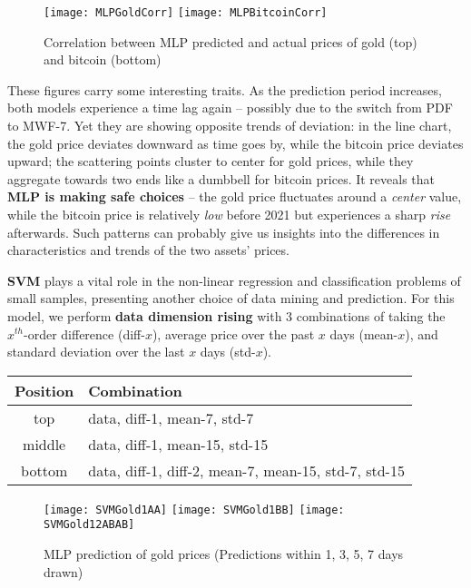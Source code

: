 \documentclass{mcmthesis}
\begin{document}
{	\begin{figure}[h]
		\centering \texttt{[image: MLPGoldCorr]}
		\centering \texttt{[image: MLPBitcoinCorr]}
		\caption{Correlation between MLP predicted and actual prices of gold (top) and bitcoin (bottom)}
	\end{figure}
	
	These figures carry some interesting traits. As the prediction period increases, both models experience a time lag again -- possibly due to the switch from PDF to MWF-7. Yet they are showing opposite trends of deviation: in the line chart, the gold price deviates downward as time goes by, while the bitcoin price deviates upward; the scattering points cluster to center for gold prices, while they aggregate towards two ends like a dumbbell for bitcoin prices. It reveals that \textbf{MLP is making safe choices} -- the gold price fluctuates around a \textit{center} value, while the bitcoin price is relatively \textit{low} before 2021 but experiences a sharp \textit{rise} afterwards. Such patterns can probably give us insights into the differences in characteristics and trends of the two assets' prices. 
	
	\textbf{SVM} plays a vital role in the non-linear regression and classification problems of small samples, presenting another choice of data mining and prediction. For this model, we perform \textbf{data dimension rising} with 3 combinations of taking the $x^{th}$-order difference (diff-$x$), average price over the past $x$ days (mean-$x$), and standard deviation over the last $x$ days (std-$x$). 
	
	\begin{center}
		\begin{tabular}{cl}
			\toprule
			Position & Combination \\ \midrule
			top & data, diff-1, mean-7, std-7 \\
			middle & data, diff-1, mean-15, std-15 \\
			bottom & data, diff-1, diff-2, mean-7, mean-15, std-7, std-15 \\
			\bottomrule
		\end{tabular}
	\end{center}
	
	\begin{figure}[h]
		\centering \texttt{[image: SVMGold1AA]}
		\centering \texttt{[image: SVMGold1BB]}
		\centering \texttt{[image: SVMGold12ABAB]}
		\caption{MLP prediction of gold prices (Predictions within 1, 3, 5, 7 days drawn)}
	\end{figure}
	
}
\end{document}
